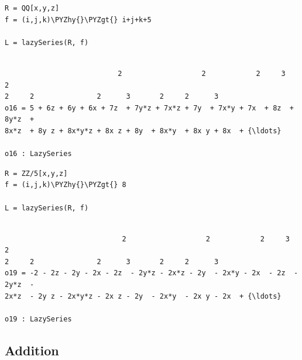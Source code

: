 \documentclass[11pt]{article}
\makeatletter
\def\PYZgt{\char`\>}
\def\PYZhy{\char`\-}
\newcommand{\boxspacing}{\kern\kvtcb@left@rule\kern\kvtcb@boxsep}
\newcommand{\prompt}[4]{
        {\ttfamily\llap{{\color{#2}[#3]:\hspace{3pt}#4}}\vspace{-\baselineskip}}
    }
\makeatother
\begin{document}
    \begin{tcolorbox}[breakable, size=fbox, boxrule=1pt, pad at break*=1mm,colback=cellbackground, colframe=cellborder]
\prompt{In}{incolor}{16}{\boxspacing}
\begin{Verbatim}[commandchars=\\\{\}]
R = QQ[x,y,z]
f = (i,j,k)\PYZhy{}\PYZgt{} i+j+k+5

L = lazySeries(R, f)
\end{Verbatim}
\end{tcolorbox}

    \begin{Verbatim}[commandchars=\\\{\}]

                           2                   2            2     3       2
2     2               2      3       2     2      3
o16 = 5 + 6z + 6y + 6x + 7z  + 7y*z + 7x*z + 7y  + 7x*y + 7x  + 8z  + 8y*z  +
8x*z  + 8y z + 8x*y*z + 8x z + 8y  + 8x*y  + 8x y + 8x  + {\ldots}

o16 : LazySeries
    \end{Verbatim}

    \begin{tcolorbox}[breakable, size=fbox, boxrule=1pt, pad at break*=1mm,colback=cellbackground, colframe=cellborder]
\prompt{In}{incolor}{19}{\boxspacing}
\begin{Verbatim}[commandchars=\\\{\}]
R = ZZ/5[x,y,z]
f = (i,j,k)\PYZhy{}\PYZgt{} 8

L = lazySeries(R, f)
\end{Verbatim}
\end{tcolorbox}

    \begin{Verbatim}[commandchars=\\\{\}]

                            2                   2            2     3       2
2     2               2      3       2     2      3
o19 = -2 - 2z - 2y - 2x - 2z  - 2y*z - 2x*z - 2y  - 2x*y - 2x  - 2z  - 2y*z  -
2x*z  - 2y z - 2x*y*z - 2x z - 2y  - 2x*y  - 2x y - 2x  + {\ldots}

o19 : LazySeries
    \end{Verbatim}

    \hypertarget{addition}{%
\subsection{Addition}\label{addition}}
\end{document}
